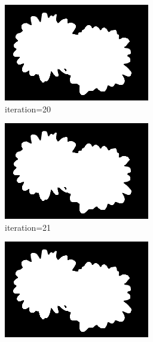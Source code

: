\documentclass{article}
\begin{document}
\begin{figure}[t]
\begin{subfigure}[t]{0.19\textwidth}
\includegraphics[width=\textwidth]{./images/marginals_iter_20.png}
\vspace{-0.6cm}
\caption{iteration=20}
\end{subfigure}
\begin{subfigure}[t]{0.19\textwidth}
\centering
\includegraphics[width=\textwidth]{./images/marginals_iter_21.png}
\vspace{-0.6cm}
\caption{iteration=21}
\end{subfigure}
\begin{subfigure}[t]{0.19\textwidth}
\centering
\includegraphics[width=\textwidth]{./images/marginals_iter_22.png}

\end{subfigure}
\end{figure}
\end{document}
